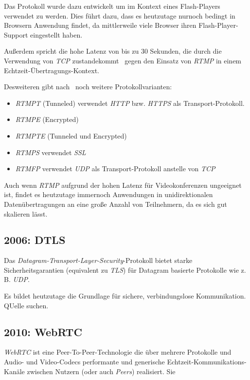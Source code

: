 \documentclass{article}
\begin{document}
\begin{onecolumn}
Das Protokoll wurde dazu entwickelt um im Kontext eines Flash-Players verwendet
zu werden. Dies führt dazu, dass es heutzutage nurnoch bedingt in Browsern
Anwendung findet, da mittlerweile viele Browser ihren Flash-Player-Support
eingestellt haben.~\cite{RTMPFlashSupport}

Außerdem spricht die hohe Latenz von bis zu 30 Sekunden, die durch die
Verwendung von \textit{TCP} zustandekommt~\cite{StreamingProtokolle} gegen den
Einsatz von \textit{RTMP} in einem Echtzeit-Übertragungs-Kontext.

Desweiteren gibt nach~\cite{RTMP} noch weitere Protokollvarianten:

\begin{itemize}
	\item \textit{RTMPT} (Tunneled) verwendet \textit{HTTP} bzw. \textit{HTTPS}
		als Transport-Protokoll.
	\item \textit{RTMPE} (Encrypted)
	\item \textit{RTMPTE} (Tunneled und Encrypted)
	\item \textit{RTMPS} verwendet \textit{SSL}
	\item \textit{RTMFP} verwendet \textit{UDP} als Transport-Protokoll
		anstelle von \textit{TCP}
\end{itemize}

Auch wenn \textit{RTMP} aufgrund der hohen Latenz für Videokonferenzen
ungeeignet ist, findet es heutzutage immernoch Anwendungen in
unidirektionalen Datenübertragungen an eine große Anzahl von Teilnehmern, da es
sich gut skalieren lässt.~\cite{RTMP}

\subsection{2006: DTLS}

Das \textit{Datagram-Transport-Layer-Security}-Protokoll bietet starke
Sicherheitsgarantien (equivalent zu \textit{TLS}) für Datagram basierte
Protokolle wie z. B. \textit{UDP}.~\cite{RFC4347}

Es bildet heutzutage die Grundlage für sichere, verbindungslose Kommunikation.
QUelle suchen.


\subsection{2010: WebRTC}

\textit{WebRTC} ist eine Peer-To-Peer-Technologie die über mehrere Protokolle
und Audio- und Video-Codecs performante und generische
Echtzeit-Kommunikations-Kanäle zwischen Nutzern (oder auch \textit{Peers})
realisiert. Sie 


\end{onecolumn}
\end{document}
